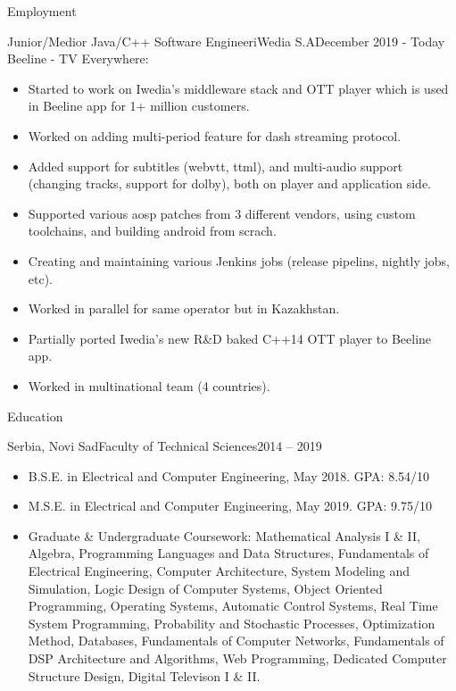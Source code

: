 \documentclass[]{mcdowellcv}
\begin{document}
\begin{cvsection}{Employment}
		\begin{cvsubsection}{Junior/Medior Java/C++ Software Engineer}{iWedia S.A}{December 2019 - Today}\vspace{\baselineskip}
			Beeline - TV Everywhere:
			\begin{itemize}
				\item Started to work on Iwedia's middleware stack and OTT player which is used in Beeline app for 1+ million customers.
				\item Worked on adding multi-period feature for dash streaming protocol.
				\item Added support for subtitles (webvtt, ttml), and multi-audio support (changing tracks, support for dolby), both on player and application side.
				\item Supported various aosp patches from 3 different vendors, using custom toolchains, and building android from scrach.
				\item Creating and maintaining various Jenkins jobs (release pipelins, nightly jobs, etc).
				\item Worked in parallel for same operator but in Kazakhstan.
				\item Partially ported Iwedia's new R\&D baked C++14 OTT player to Beeline app. 
				\item Worked in multinational team (4 countries).
			\end{itemize}
		\end{cvsubsection}
	\end{cvsection}

	\begin{cvsection}{Education}
		\begin{cvsubsection}{Serbia, Novi Sad}{Faculty of Technical Sciences}{2014 -- 2019}
			\begin{itemize}
				\item B.S.E. in Electrical and Computer Engineering, May 2018. GPA: 8.54/10
				\item M.S.E. in Electrical and Computer Engineering, May 2019. GPA: 9.75/10
				\item Graduate \& Undergraduate Coursework: Mathematical Analysis I \& II, Algebra, Programming Languages and Data Structures,
				Fundamentals of Electrical Engineering, Computer Architecture, System Modeling and Simulation, Logic Design of Computer Systems,
				Object Oriented Programming, Operating Systems, Automatic Control Systems, Real Time System Programming, Probability and Stochastic Processes,
				Optimization Method, Databases, Fundamentals of Computer Networks, Fundamentals of DSP Architecture and Algorithms,
				Web Programming, Dedicated Computer Structure Design, Digital Televison I \& II.
			\end{itemize}
		\end{cvsubsection}
	\end{cvsection}
\end{document}
